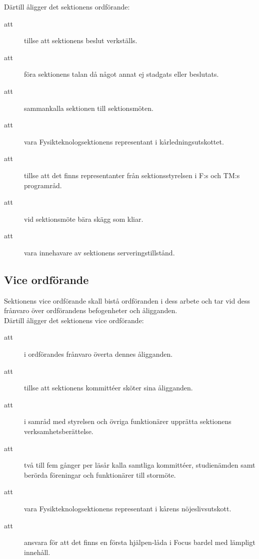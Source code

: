\documentclass[a4paper]{article}
\begin{document}
\begin{foreningenv}{\forening{}}
    Därtill åligger det sektionens ordförande:
    \begin{description}
        \item[att] tillse att sektionens beslut verkställs. 
        \item[att] föra sektionens talan då något annat ej stadgats eller beslutats.
        \item[att] sammankalla sektionen till sektionsmöten.
        \item[att] vara Fysikteknologsektionens representant i kårledningsutskottet.
        \item[att] tillse att det finns representanter från sektionsstyrelsen i F:s och TM:s programråd.
        \item[att] vid sektionsmöte bära skägg som kliar.
        \item[att] vara innehavare av sektionens serveringstillstånd.
    \end{description}
    
    \subsection{Vice ordförande}
    Sektionens vice ordförande skall bistå ordföranden i dess arbete och tar vid dess frånvaro över ordförandens befogenheter och åligganden. \\
    
    Därtill åligger det sektionens vice ordförande:
    \begin{description}
        \item[att] i ordförandes frånvaro överta dennes åligganden. 
        \item[att] tillse att sektionens kommittéer sköter sina åligganden. 
        \item[att] i samråd med styrelsen och övriga funktionärer upprätta sektionens verksamhetsberättelse.
        \item[att] två till fem gånger per läsår kalla samtliga kommittéer, studienämden samt berörda föreningar och funktionärer till stormöte. 
        \item[att] vara Fysikteknologsektionens representant i kårens nöjeslivsutskott. 
        \item[att] ansvara för att det finns en första hjälpen-låda i Focus bardel med lämpligt innehåll. 
    \end{description}
    

\end{foreningenv}
\end{document}

